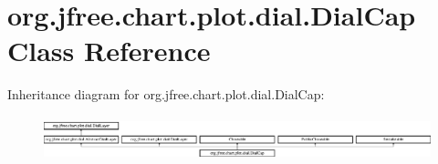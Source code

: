 \hypertarget{classorg_1_1jfree_1_1chart_1_1plot_1_1dial_1_1_dial_cap}{}\section{org.\+jfree.\+chart.\+plot.\+dial.\+Dial\+Cap Class Reference}
\label{classorg_1_1jfree_1_1chart_1_1plot_1_1dial_1_1_dial_cap}
Inheritance diagram for org.\+jfree.\+chart.\+plot.\+dial.\+Dial\+Cap\+:\begin{figure}[H]
\begin{center}
\leavevmode
\includegraphics[height=1.312500cm]{classorg_1_1jfree_1_1chart_1_1plot_1_1dial_1_1_dial_cap}
\end{center}
\end{figure}
